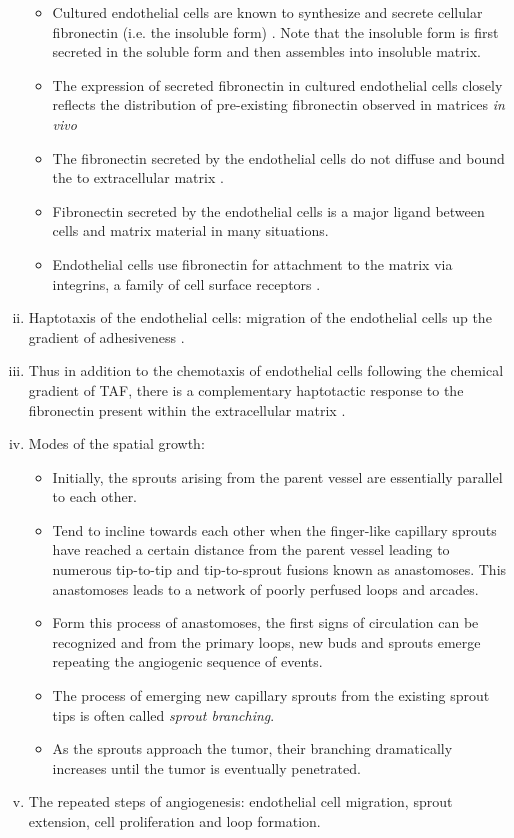 \begin{enumerate}[(i),noitemsep]
	\begin{itemize}
		\item Cultured endothelial cells are known to synthesize and secrete cellular fibronectin (i.e. the insoluble form) \cite{Birdwell1978,Birdwell1980,1978,Macarak1978,Nerlich1991}. Note that the insoluble form is first secreted in the soluble form and then assembles into insoluble matrix.
		\item The expression of secreted fibronectin in cultured endothelial cells closely reflects the distribution of pre-existing fibronectin  observed in matrices \emph{in vivo} \cite{Vlodavsky1979,Hynes1989-je}
		\item The fibronectin secreted by the endothelial cells do not diffuse and bound the to extracellular matrix \cite{Birdwell1980,Hynes1989-je}.
		\item Fibronectin secreted by the endothelial cells is a major ligand between cells and matrix material in many situations.
		\item Endothelial cells use fibronectin for attachment to the matrix via integrins, a family of cell surface receptors \cite{Johansson1987,Hynes1989-je,Alberts2002a}.
	\end{itemize}
	\item Haptotaxis of the endothelial cells: migration of the endothelial cells up the gradient of adhesiveness \cite{Everitt1996,McCarthy1984,Carter1965}.
	\item Thus in addition to the chemotaxis of endothelial cells following the chemical gradient of TAF, there is a complementary haptotactic response to the fibronectin present within the extracellular matrix \cite{Bowersox1982}.
	\item Modes of the spatial growth:
	\begin{itemize}
		\item Initially, the sprouts arising from the parent vessel are essentially parallel to each other. 
		\item Tend to incline towards each other when the finger-like capillary sprouts have reached a certain distance from the parent vessel \cite{Paweletz1989} leading to numerous tip-to-tip and tip-to-sprout fusions known as anastomoses. This anastomoses leads to a network of poorly perfused loops and arcades.
		\item Form this process of anastomoses, the first signs of circulation can be recognized and from the primary loops, new buds and sprouts emerge repeating the angiogenic sequence of events.
		\item The process of emerging new capillary sprouts from the existing sprout tips is often called \emph{sprout branching}.
		\item As the sprouts approach the tumor, their branching dramatically increases until the tumor is eventually penetrated.
	\end{itemize}
	\item The repeated steps of angiogenesis: endothelial cell migration, sprout extension, cell proliferation and loop formation.
\end{enumerate}

